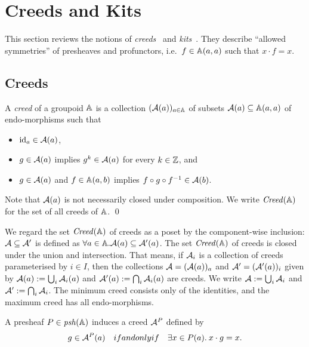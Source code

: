 \section{Creeds and Kits}
This section reviews the notions of \emph{creeds}~\cite{Taylor1989} and \emph{kits}~\cite{Fiore2024}.
They describe ``allowed symmetries'' of presheaves and profunctors, i.e.~\( f \in \mathbb{A}(a,a) \) such that \( x \cdot f = x \).

\subsection{Creeds}
\begin{definition}[Creed]
    A \emph{creed} of a groupoid \( \mathbb{A} \) is a collection \( (\mathcal{A}(a))_{a \in \mathbb{A}} \) of subsets \( \mathcal{A}(a) \subseteq \mathbb{A}(a,a) \) of endo-morphisms such that
    \begin{itemize}
        \item \( \mathrm{id}_a \in \mathcal{A}(a) \),
        \item \( g \in \mathcal{A}(a) \) implies \( g^k \in \mathcal{A}(a) \) for every \( k \in \mathbb{Z} \), and
        \item \( g \in \mathcal{A}(a) \) and \( f \in \mathbb{A}(a,b) \) implies \( f \circ g \circ f^{-1} \in \mathcal{A}(b) \).
    \end{itemize}
    Note that \( \mathcal{A}(a) \) is not necessarily closed under composition.
    We write \( \mathit{Creed}(\mathbb{A}) \) for the set of all creeds of \( \mathbb{A} \).
    \qed
\end{definition}

We regard the set \( \mathit{Creed}(\mathbb{A}) \) of creeds as a poset by the component-wise inclusion: \( \mathcal{A} \subseteq \mathcal{A}' \) is defined as \( \forall a \in \mathbb{A}. \mathcal{A}(a) \subseteq \mathcal{A}'(a) \).
The set \( \mathit{Creed}(\mathbb{A}) \) of creeds is closed under the union and intersection.
That means, if \( \mathcal{A}_i \) is a collection of creeds parameterised by \( i \in I \), then the collections \( \mathcal{A} = (\mathcal{A}(a))_a \) and \( \mathcal{A}' = (\mathcal{A}'(a))_i \) given by \( \mathcal{A}(a) := \bigcup_i \mathcal{A}_i(a) \) and \( \mathcal{A}'(a) := \bigcap_i \mathcal{A}_i(a) \) are creeds.
We write \( \mathcal{A} := \bigcup_i \mathcal{A}_i \) and \( \mathcal{A}' := \bigcap_i \mathcal{A}_i \).
The minimum creed consists only of the identities, and the maximum creed has all endo-morphisms.

A presheaf \( P \in \mathit{psh}(\mathbb{A}) \) induces a creed \( \mathcal{A}^P \) defined by
\begin{equation*}
    g \in \mathcal{A}^P(a)
    \quad\relax{if and only if}\quad
    \exists x \in P(a).\: x \cdot g = x.
\end{equation*}

